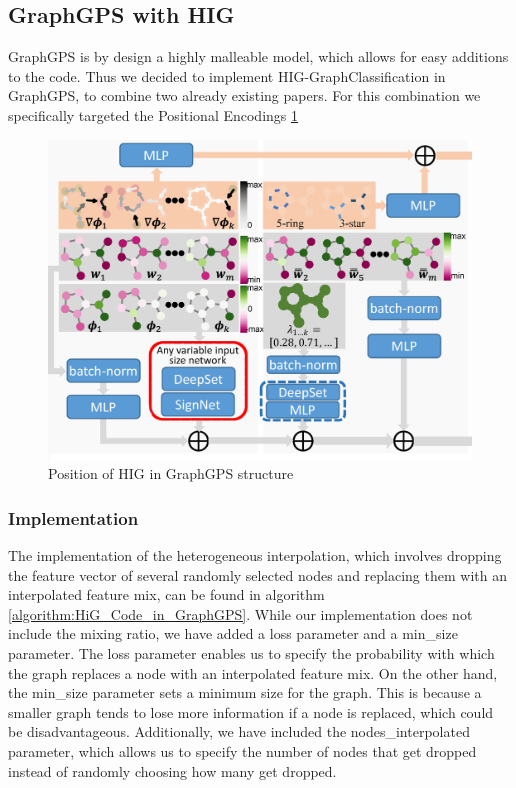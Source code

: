 \subsection{GraphGPS with HIG}
GraphGPS is by design a highly malleable model, which allows for easy additions to the code. Thus we decided to implement HIG-GraphClassification in GraphGPS, to combine two already existing papers. For this combination we specifically targeted the Positional Encodings \ref{fig:gps-hig-position}

\begin{figure}[ht]
    \centering
    \includegraphics[scale=0.2]{tex/res/gps_hig_position.png}
    \caption{Position of HIG in GraphGPS structure}
    \label{fig:gps-hig-position}
\end{figure}

\subsubsection{Implementation}

The implementation of the heterogeneous interpolation, which involves dropping the feature vector of several randomly selected nodes and replacing them with an interpolated feature mix, can be found in algorithm \ref{algorithm:HiG_Code_in_GraphGPS}. While our implementation does not include the mixing ratio, we have added a loss parameter and a min\_size parameter. The loss parameter enables us to specify the probability with which the graph replaces a node with an interpolated feature mix. On the other hand, the min\_size parameter sets a minimum size for the graph. This is because a smaller graph tends to lose more information if a node is replaced, which could be disadvantageous. Additionally, we have included the nodes\_interpolated parameter, which allows us to specify the number of nodes that get dropped instead of randomly choosing how many get dropped.

